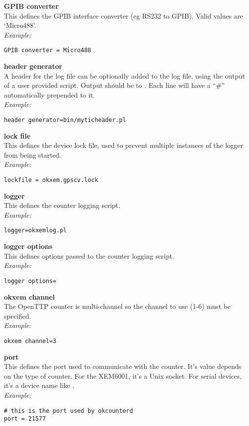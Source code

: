{\bfseries GPIB converter}\\
This defines the GPIB interface converter (eg RS232 to GPIB).
Valid values are `Micro488'.\\
\textit{Example:}
\begin{lstlisting}
GPIB converter = Micro488
\end{lstlisting}

{\bfseries header generator}\\
A header for the log file can be optionally added to the log file, using the output
of a user provided script. Output should be to .
Each line will have a ``\#'' automatically prepended to it.\\
\textit{Example:}
\begin{lstlisting}
header generator=bin/myticheader.pl
\end{lstlisting}

{\bfseries lock file}\\
This defines the device lock file, used to prevent multiple instances of the logger
from being started.\\
\textit{Example:}
\begin{lstlisting}
lockfile = okxem.gpscv.lock
\end{lstlisting}

{\bfseries logger}\\
This defines the counter logging script.\\
\textit{Example:}
\begin{lstlisting}
logger=okxemlog.pl
\end{lstlisting}

{\bfseries logger options}\\
This defines options passed to the counter logging script.\\
\textit{Example:}
\begin{lstlisting}
logger options=
\end{lstlisting}

{\bfseries okxem channel}\\
The OpenTTP counter is multi-channel so the channel to use (1-6) must be specified.\\
\textit{Example:}
\begin{lstlisting}
okxem channel=3
\end{lstlisting}

{\bfseries port}\\
This defines the port used to communicate with the counter. It's value depends on the type of counter. 
For the XEM6001, it's a Unix socket. For serial devices, it's a device name like
.\\
\textit{Example:}
\begin{lstlisting}
# this is the port used by okcounterd
port = 21577 
\end{lstlisting}

